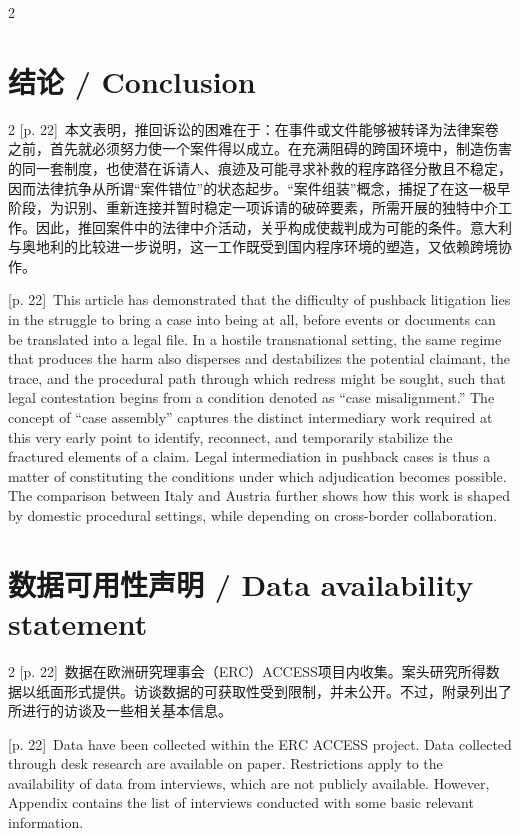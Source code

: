 \documentclass[10pt,a4paper]{article}
\begin{document}
\begin{paracol}{2}
\switchcolumn*
\end{paracol}
\section*{结论 / Conclusion}
\begin{paracol}{2}
{\scriptsize\color{gray} [p. 22]}\ 本文表明，推回诉讼的困难在于：在事件或文件能够被转译为法律案卷之前，首先就必须努力使一个案件得以成立。在充满阻碍的跨国环境中，制造伤害的同一套制度，也使潜在诉请人、痕迹及可能寻求补救的程序路径分散且不稳定，因而法律抗争从所谓“案件错位”的状态起步。“案件组装”概念，捕捉了在这一极早阶段，为识别、重新连接并暂时稳定一项诉请的破碎要素，所需开展的独特中介工作。因此，推回案件中的法律中介活动，关乎构成使裁判成为可能的条件。意大利与奥地利的比较进一步说明，这一工作既受到国内程序环境的塑造，又依赖跨境协作。\par
\switchcolumn
{\scriptsize\color{gray} [p. 22]}\ This article has demonstrated that the difficulty of pushback litigation lies in the struggle to bring a case into being at all, before events or documents can be translated into a legal file. In a hostile transnational setting, the same regime that produces the harm also disperses and destabilizes the potential claimant, the trace, and the procedural path through which redress might be sought, such that legal contestation begins from a condition denoted as “case misalignment.” The concept of “case assembly” captures the distinct intermediary work required at this very early point to identify, reconnect, and temporarily stabilize the fractured elements of a claim. Legal intermediation in pushback cases is thus a matter of constituting the conditions under which adjudication becomes possible. The comparison between Italy and Austria further shows how this work is shaped by domestic procedural settings, while depending on cross-border collaboration.\par
\switchcolumn*
\end{paracol}
\section*{数据可用性声明 / Data availability statement}
\begin{paracol}{2}
{\scriptsize\color{gray} [p. 22]}\ 数据在欧洲研究理事会（ERC）ACCESS项目内收集。案头研究所得数据以纸面形式提供。访谈数据的可获取性受到限制，并未公开。不过，附录列出了所进行的访谈及一些相关基本信息。\par
\switchcolumn
{\scriptsize\color{gray} [p. 22]}\ Data have been collected within the ERC ACCESS project. Data collected through desk research are available on paper. Restrictions apply to the availability of data from interviews, which are not publicly available. However, Appendix contains the list of interviews conducted with some basic relevant information.\par
\switchcolumn*
\end{paracol}
\end{document}
